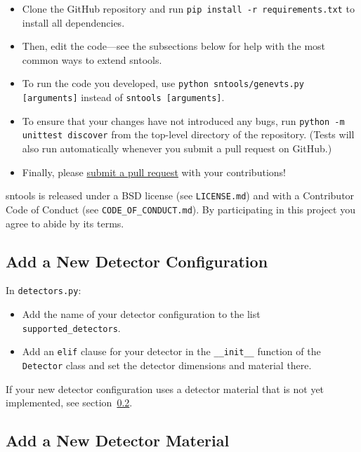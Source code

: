 \documentclass[11pt, oneside]{article}
\begin{document}
\begin{itemize}
	\item Clone the GitHub repository and run \texttt{pip install -r requirements.txt} to install all dependencies.
	\item Then, edit the code---see the subsections below for help with the most common ways to extend sntools.
	\item To run the code you developed, use \texttt{python sntools/genevts.py [arguments]} instead of \texttt{sntools [arguments]}.
	\item To ensure that your changes have not introduced any bugs, run \texttt{python -m unittest discover} from the top-level directory of the repository. (Tests will also run automatically whenever you submit a pull request on GitHub.)
	\item Finally, please \href{https://docs.github.com/en/github/collaborating-with-issues-and-pull-requests/about-pull-requests}{submit a pull request} with your contributions!
\end{itemize}

sntools is released under a BSD license (see \texttt{LICENSE.md}) and with a Contributor Code of Conduct (see \texttt{CODE\_OF\_CONDUCT.md}).
By participating in this project you agree to abide by its terms.


\subsection{Add a New Detector Configuration}\label{sec:new-detector-config}

In \texttt{detectors.py}:
\begin{itemize}
\item Add the name of your detector configuration to the list \texttt{supported\_detectors}.
\item Add an \texttt{elif} clause for your detector in the \texttt{\_\_init\_\_} function of the \texttt{Detector} class and set the detector dimensions and material there.
\end{itemize}

If your new detector configuration uses a detector material that is not yet implemented, see section~\ref{sec:new-detector-material}.

\subsection{Add a New Detector Material}\label{sec:new-detector-material}
\end{document}
